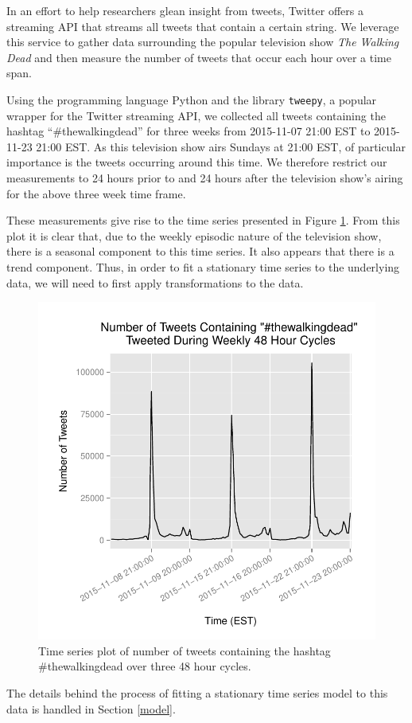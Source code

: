 In an effort to help researchers glean insight from tweets, Twitter offers
a streaming API that streams all tweets that contain a certain string.
We leverage this service to gather data surrounding the popular television
show \textit{The Walking Dead} and then measure the number of tweets that occur each
hour over a time span.

Using the programming language Python and the library \texttt{tweepy}, a popular
wrapper for the Twitter streaming API, we collected all tweets containing the
hashtag ``\#thewalkingdead'' for three weeks from 2015-11-07 21:00 EST to
2015-11-23 21:00 EST. As this television show airs Sundays at 21:00 EST,
of particular importance is the tweets occurring around this time.
We therefore restrict our measurements to 24 hours prior to and 24 hours after
the television show's airing for the above three week time frame.

These measurements give rise to the time series presented in Figure \ref{tweets_plot}.
From this plot it is clear that, due to the weekly episodic nature of the television
show, there is a seasonal component to this time series. It also appears that
there is a trend component. Thus, in order to fit a stationary time series
to the underlying data, we will need to first apply transformations to the data.

\begin{figure}[!t]
  \centerline{\includegraphics[scale=0.75]{../analysis/plots/tweets_plot}}
  \caption{Time series plot of number of tweets containing the hashtag
  \#thewalkingdead over three 48 hour cycles.}\label{tweets_plot}
\end{figure}

The details behind the process of fitting a stationary time series model to this data is handled in
Section \ref{model}.